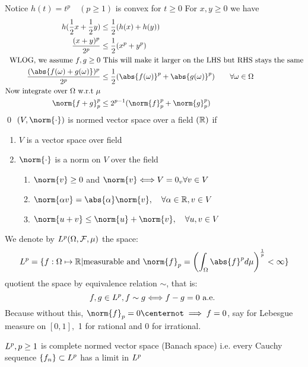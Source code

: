 Notice $h(t) = t^p \quad (p \geq 1)$ is convex for $t \geq 0$ For $x,y\geq 0$ we have 
\begin{align*}
    h(\frac{1}{2}x + \frac{1}{2}y) &\leq \frac{1}{2}(h(x)+h(y)) \\
    \frac{(x+y)^p}{2^p} &\leq  \frac{1}{2}(x^p + y^p) \\
    \text{WLOG, we assume } f,g \geq 0 &\text{ This will make it larger on the LHS but RHS stays the same} \\
    \frac{(\abs{f(\omega)+g(\omega)})^p}{2^p} &\leq  \frac{1}{2}(\abs{f(\omega)}^p + \abs{g(\omega)}^p) \qquad \forall \omega \in \Omega\\
    \text{Now integrate over $\Omega$ w.r.t } \mu \\
    \norm{f+g}_p^p &\leq 2^{p-1}(\norm{f}_p^p +\norm{g}_p^p)
\end{align*}
\qed
\newpage
$(V, \norm{\cdot})$ is normed vector space over a field $(\mathbb{R})$ if
\begin{enumerate}
    \item $V$ is a vector space over field
    \item $\norm{\cdot}$ is a norm on $V$ over the field
    \begin{enumerate}
        \item $\norm{v}\geq 0$ and $\norm{v} \Longleftrightarrow V = 0_v \forall v\in V$
        \item $\norm{\alpha v} = \abs{\alpha}\norm{v}, \quad \forall\alpha\in \R, v\in V$
        \item $\norm{u+v} \leq \norm{u}+\norm{v}, \quad \forall u,v\in V$
    \end{enumerate}
\end{enumerate}
We denote by $L^{p}(\Omega, \mathcal{F}, \mu)$ the space:
\begin{equation*}
    \ls{p} = \{f:\Omega \mapsto \R| \text{measurable and } \norm{f}_p = \left( \into \abs{f}^p d\mu \right)^{\frac{1}{p}} < \infty\} 
\end{equation*}quotient the space by equivalence relation $\sim$, that is:
\begin{equation*}
    f,g\in L^{p}, f\sim g \Longleftrightarrow f-g = 0 \text{ a.e. }
\end{equation*}Because without this, $\norm{f}_p = 0 \notimplies f = 0$, say for Lebesgue measure on $[0,1],$ 1 for rational and 0 for irrational.
\begin{thm}
$L^{p}, p \geq 1$ is complete normed vector space (Banach space) i.e. every Cauchy sequence $\{f_n\}\subset L^{p}$ has a limit in $L^{p}$
\end{thm}
